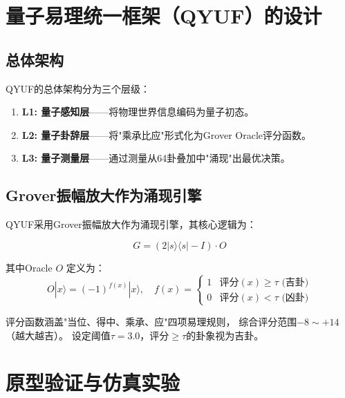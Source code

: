 \documentclass[twocolumn]{article}
\begin{document}
\section{量子易理统一框架（QYUF）的设计}

\subsection{总体架构}

QYUF的总体架构分为三个层级：

\begin{enumerate}
  \item \textbf{L1: 量子感知层}——将物理世界信息编码为量子初态。
  \item \textbf{L2: 量子卦辞层}——将"乘承比应"形式化为Grover Oracle评分函数。
  \item \textbf{L3: 量子测量层}——通过测量从64卦叠加中"涌现"出最优决策。
\end{enumerate}

\subsection{Grover振幅放大作为涌现引擎}

QYUF采用Grover振幅放大作为涌现引擎，其核心逻辑为：

\begin{equation}
    G = (2|s\rangle\langle s| - I) \cdot O
\end{equation}

其中Oracle $O$ 定义为：
\begin{equation}
    O|x\rangle = (-1)^{f(x)}|x\rangle,\quad
    f(x) = \begin{cases}
        1 & \text{评分}(x) \geq \tau \text{ (吉卦)} \\
        0 & \text{评分}(x) < \tau \text{ (凶卦)}
    \end{cases}
\end{equation}

评分函数涵盖"当位、得中、乘承、应"四项易理规则，
综合评分范围$-8 \sim +14$（越大越吉）。
设定阈值$\tau = 3.0$，评分$\geq \tau$的卦象视为吉卦。

\section{原型验证与仿真实验}
\end{document}
